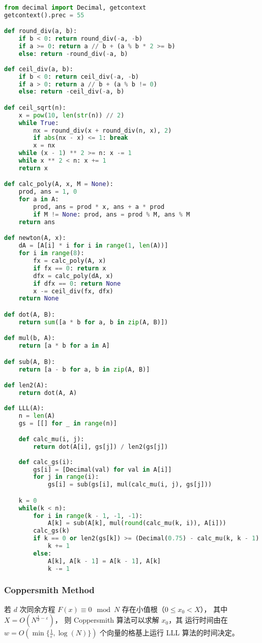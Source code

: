 \documentclass{ctexart}
\begin{document}
\begin{lstlisting}[language = Python]
from decimal import Decimal, getcontext
getcontext().prec = 55

def round_div(a, b):
    if b < 0: return round_div(-a, -b)
    if a >= 0: return a // b + (a % b * 2 >= b)
    else: return -round_div(-a, b)
    
def ceil_div(a, b):
    if b < 0: return ceil_div(-a, -b)
    if a > 0: return a // b + (a % b != 0)
    else: return -ceil_div(-a, b)

def ceil_sqrt(n):
    x = pow(10, len(str(n)) // 2)
    while True:
        nx = round_div(x + round_div(n, x), 2)
        if abs(nx - x) <= 1: break
        x = nx
    while (x - 1) ** 2 >= n: x -= 1
    while x ** 2 < n: x += 1
    return x

def calc_poly(A, x, M = None):
    prod, ans = 1, 0
    for a in A:
        prod, ans = prod * x, ans + a * prod
        if M != None: prod, ans = prod % M, ans % M
    return ans

def newton(A, x):
    dA = [A[i] * i for i in range(1, len(A))]
    for i in range(8):
        fx = calc_poly(A, x)
        if fx == 0: return x
        dfx = calc_poly(dA, x)
        if dfx == 0: return None
        x -= ceil_div(fx, dfx)
    return None

def dot(A, B):
    return sum([a * b for a, b in zip(A, B)])

def mul(b, A):
    return [a * b for a in A]

def sub(A, B):
    return [a - b for a, b in zip(A, B)]

def len2(A):
    return dot(A, A)
    
def LLL(A):
    n = len(A)
    gs = [[] for _ in range(n)]

    def calc_mu(i, j):
        return dot(A[i], gs[j]) / len2(gs[j])
    
    def calc_gs(i):
        gs[i] = [Decimal(val) for val in A[i]]
        for j in range(i):
            gs[i] = sub(gs[i], mul(calc_mu(i, j), gs[j]))

    k = 0
    while(k < n):
        for i in range(k - 1, -1, -1):
            A[k] = sub(A[k], mul(round(calc_mu(k, i)), A[i]))
        calc_gs(k)
        if k == 0 or len2(gs[k]) >= (Decimal(0.75) - calc_mu(k, k - 1) ** 2) * len2(gs[k - 1]):
            k += 1
        else:
            A[k], A[k - 1] = A[k - 1], A[k]
            k -= 1
\end{lstlisting}

\subsubsection{Coppersmith Method}
若 $d$ 次同余方程 $F(x) \equiv 0 \mod N$ 存在小值根（$0 \le x_0 < X$），
其中 $X = O(N^{\frac{1}{d} - \varepsilon})$，
则 Coppersmith 算法可以求解 $x_0$，其
运行时间由在 $w = O(\min\{\frac{1}{\varepsilon}, \log(N)\})$ 个向量的格基上运行 LLL 算法的时间决定。
\end{document}
